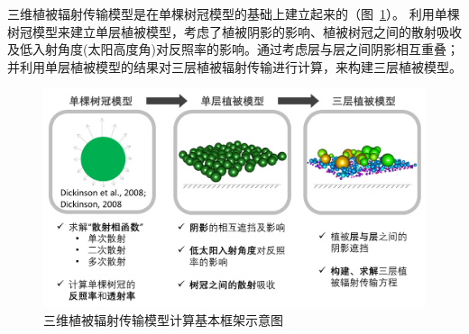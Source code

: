 三维植被辐射传输模型\citep{yuan20143d}是在单棵树冠模型\citep{dickinson2008determination,dickinson2008three}的基础上建立起来的（图~\ref{fig:三维植被辐射传输模型的基本框架}）。
利用单棵树冠模型来建立单层植被模型，考虑了植被阴影的影响、植被树冠之间的散射吸收及低入射角度(太阳高度角)对反照率的影响。通过考虑层与层之间阴影相互重叠；
并利用单层植被模型的结果对三层植被辐射传输进行计算，来构建三层植被模型。
{
\begin{figure}[htbp]
\centering
\includegraphics[width=0.95\columnwidth]{Figures/辐射过程及辐射通量计算/三维植被辐射传输模型基本框架.png}
\caption{三维植被辐射传输模型计算基本框架示意图}
\label{fig:三维植被辐射传输模型的基本框架}
\end{figure}
}



